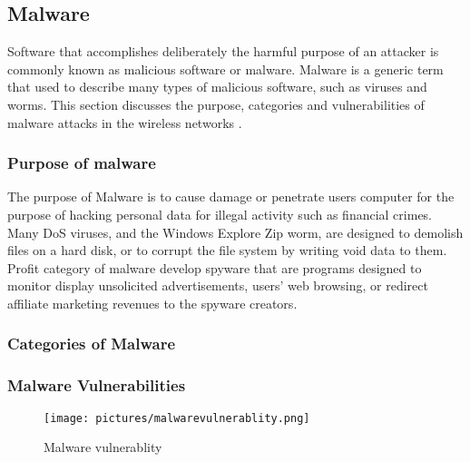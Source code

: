 \documentclass[twocolumn]{article}
\begin{document}
\subsection{Malware}
Software that accomplishes deliberately the harmful purpose of an attacker is commonly known as malicious software or malware. Malware is a generic term that 
used to describe many types of malicious software, such as viruses and worms. 
This section discusses the purpose, categories and vulnerabilities of malware attacks in the wireless networks     \cite{divya2013survey}. 
\subsubsection{Purpose of malware}
The purpose of Malware is to cause damage or penetrate users computer for the purpose of hacking personal data for illegal activity such as financial crimes. Many DoS viruses, and the 
Windows Explore Zip worm, are designed to demolish files on a hard disk, or to corrupt the file system by writing void data to them. Profit category of malware develop spyware that are programs designed to monitor display unsolicited advertisements, users' web browsing, or 
redirect affiliate marketing revenues to the spyware creators.
\subsubsection{Categories of Malware}

\textcolor{red}{\lipsum[1]}




 

\subsubsection{Malware Vulnerabilities}

\begin{figure}[H]
\centering
\texttt{[image: pictures/malwarevulnerablity.png]}
\caption{Malware vulnerablity}
\end{figure}
\end{document}
